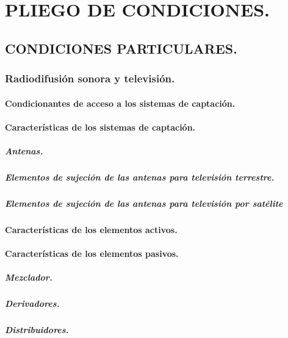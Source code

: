 \chapter{PLIEGO DE CONDICIONES.}

\section{CONDICIONES PARTICULARES.}

\subsection{Radiodifusión sonora y televisión.}
\subsubsection{Condicionantes de acceso a los sistemas de captación.}
\subsubsection{Características de los sistemas de captación.}
\paragraph{Antenas.}
\paragraph{Elementos de sujeción de las antenas para televisión terrestre.}
\paragraph{Elementos de sujeción de las antenas para televisión por satélite}
\subsubsection{Características de los elementos activos.}
\subsubsection{Características de los elementos pasivos.}
\paragraph{Mezclador.}
\paragraph{Derivadores.}
\paragraph{Distribuidores.}
